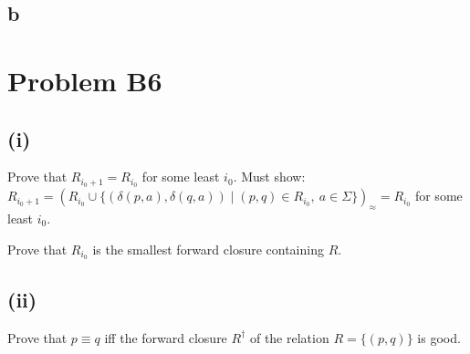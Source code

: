 \documentclass[12pt]{article}
\begin{document}
\subsection*{b}

\section*{Problem B6}

\subsection*{(i)}
Prove that $R_{i_{0}+1} = R_{i_{0}}$ for some least $i_0$.\newline
Must show: $R_{i_{0} + 1} = (R_{i_{0}} \cup 
\{(\delta(p, a), \delta(q, a)) \mid (p, q)\in R_{i_{0}},\ a\in \Sigma\})_{\approx} 
= R_{i_{0}}$ for some least $i_0$.\newline

\medskip

Prove that $R_{i_{0}}$ is the smallest forward closure
containing $R$.
\subsection*{(ii)}
Prove that $p\equiv q$ iff the forward closure $R^{\dagger}$ of the
relation $R = \{(p, q)\}$ is good.
\end{document}
